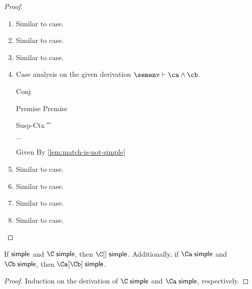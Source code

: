 \documentclass[acmsmall,screen,nonacm,review]{acmart}
\begin{document}
\begin{lemma}
\begin{proof}
\begin{enumerate}[(\roman*)]
      \item Similar to  case.
      \item Similar to  case.
      \item Similar to  case.

      \item Case analysis on the given derivation $\semenv \th \ca \cand \cb$.
      \begin{proofcases}
	\proofcasederivation
	  {Conj}
	  {\semenv \th \ca \\ \semenv \th \cb}
	  {\semenv \th \ca \cand \cb}

	\begin{llproof}
\Hand 	  \vdashPf{\semenv}{\ca} {Premise}
\Hand     \vdashPf{\semenv}{\cb} {Premise}
	\end{llproof}

	\proofcasederivation
	  {Susp-Ctx}
	  {\Cshape \C \t \sh \\ \semenv \th \C\where{\cmatched \t \sh \cbrs}}
	  {\semenv \th \underbrace{\C\where{\cmatch \t \cbrs}}_{\ca \cand \cb}}

	\begin{llproof}
	  \simplePf{\C\where{\cmatch \t \cbrs}} {Given}
	  \nsimplePf{\C\where{\cmatch \t \cbrs}} {By \cref{lem:match-is-not-simple}}
\Hand 	  \contraPf{\semenv \th \ca, \semenv \th \cb}
	\end{llproof}

      \end{proofcases}

      \item Similar to  case.
      \item Similar to  case.
      \item Similar to  case.
      \item Similar to  case.
    \end{enumerate}
  \end{proof}
\end{lemma}

\begin{lemma}
  \label{lem:compose-simple}
  If $\relax \mathrel{\mathsf{simple}}\mathclose{}$ and $\C \simple$, then $\C\where\c \simple$.
  Additionally, if $\Ca \simple$ and $\Cb \simple$, then $\Ca\where\Cb \simple$.
  \begin{proof}
    Induction on the derivation of $\C \simple$ and $\Ca \simple$, respectively.
  \end{proof}
\end{lemma}
\end{document}
